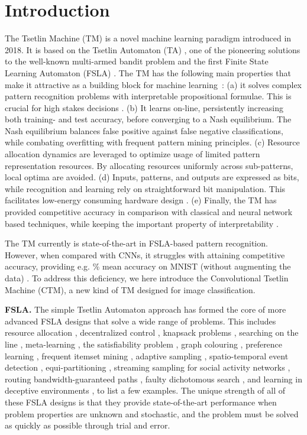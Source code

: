 \documentclass{article}
\begin{document}
\section{Introduction}
The Tsetlin Machine (TM) \cite{granmo2018tsetlin} is a novel  machine learning paradigm introduced in 2018. It is based on the Tsetlin Automaton (TA) \cite{Tsetlin1961}, one of the pioneering solutions to the well-known multi-armed bandit problem \cite{Robbins1952,Gittins1979} and the first Finite State Learning Automaton (FSLA) \cite{Narendra1989}. The TM has the following main properties that make it attractive as a building block for machine learning~\cite{granmo2018tsetlin}: (a) it solves complex pattern recognition problems with interpretable propositional formulae. This is crucial for high stakes decisions \cite{Rudin2019}. (b) It learns on-line, persistently increasing both training- and test accuracy, before converging to a Nash equilibrium. The Nash equilibrium balances false positive against false negative classifications, while combating overfitting with frequent pattern mining principles. (c) Resource allocation dynamics are leveraged to optimize usage of limited pattern representation resources. By allocating resources uniformly across sub-patterns, local optima are avoided. (d) Inputs, patterns, and outputs are expressed as bits, while recognition and learning rely on straightforward bit manipulation. This facilitates low-energy consuming hardware design \cite{wheeldon2020hardware}. (e) Finally, the TM has provided competitive accuracy in comparison with classical and neural network based techniques, while keeping the important property of interpretability \cite{berge2019,abeyrathna2019nonlinear}.

The TM currently is state-of-the-art in FSLA-based pattern recognition. However, when compared with CNNs, it struggles with attaining competitive accuracy, providing e.g. \% mean accuracy on MNIST (without augmenting the data) \cite{granmo2018tsetlin}. To address this deficiency, we here introduce the Convolutional Tsetlin Machine (CTM), a new kind of TM designed for image classification. 

\textbf{FSLA.} The simple Tsetlin Automaton approach has formed the core of more advanced FSLA designs that solve a wide range of problems. This includes resource allocation \cite{Granmo2010g},
decentralized control \cite{Tung1996},
knapsack problems \cite{Granmo2007d}, searching on the line \cite{Oommen1997}, meta-learning \cite{Oommen2008}, the satisfiability problem \cite{Granmo2007c}, graph colouring \cite{Bouhmala2010}, preference learning \cite{Yazidi2012b}, frequent itemset mining \cite{Haugland2014}, adaptive sampling \cite{Granmo2010},
spatio-temporal event detection \cite{Yazidi2013},
equi-partitioning \cite{Oommen1988}, streaming sampling for social activity networks \cite{Ghavipour2018}, routing bandwidth-guaranteed paths \cite{Oommen2007a},
faulty dichotomous search \cite{Yazidi2018}, and learning in deceptive environments \cite{Zhang2016a}, to list a few examples. The unique strength of all of these FSLA designs is that they provide state-of-the-art performance when problem properties are unknown and stochastic, and the problem must be solved as quickly as possible through trial and error. 
\end{document}
